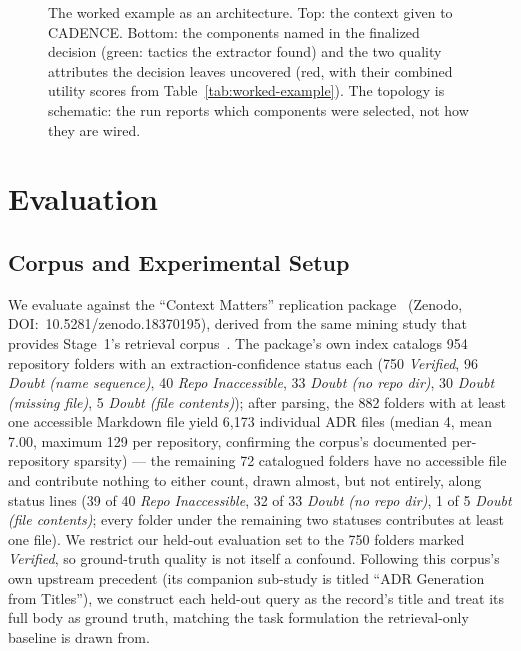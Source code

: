 \documentclass[preprint,12pt,authoryear]{elsarticle}
\renewcommand{\_}{\textunderscore\allowbreak{}}
\begin{document}
\begin{figure}[!htbp]
\centering
{}
\caption{The worked example as an architecture. Top: the context given to CADENCE. Bottom: the components named in the finalized decision (green: tactics the extractor found) and the two quality attributes the decision leaves uncovered (red, with their combined utility scores from Table~\ref{tab:worked-example}). The topology is schematic: the run reports which components were selected, not how they are wired.\label{fig:example-architecture}}
\end{figure}
\FloatBarrier

\section{Evaluation}
\label{sec:evaluation}

\subsection{Corpus and Experimental Setup}

We evaluate against the ``Context Matters'' replication package~\citep{contextmatters-zenodo} (Zenodo, DOI:~10.5281/zenodo.18370195), derived from the same mining study that provides Stage~1's retrieval corpus~\citep{buchgeher2023adr}. The package's own index catalogs 954 repository folders with an extraction-confidence status each (750 \textit{Verified}, 96 \textit{Doubt (name sequence)}, 40 \textit{Repo Inaccessible}, 33 \textit{Doubt (no repo dir)}, 30 \textit{Doubt (missing file)}, 5 \textit{Doubt (file contents)}); after parsing, the 882 folders with at least one accessible Markdown file yield 6{,}173 individual ADR files (median 4, mean 7.00, maximum 129 per repository, confirming the corpus's documented per-repository sparsity) --- the remaining 72 catalogued folders have no accessible file and contribute nothing to either count, drawn almost, but not entirely, along status lines (39 of 40 \textit{Repo Inaccessible}, 32 of 33 \textit{Doubt (no repo dir)}, 1 of 5 \textit{Doubt (file contents)}; every folder under the remaining two statuses contributes at least one file). We restrict our held-out evaluation set to the 750 folders marked \textit{Verified}, so ground-truth quality is not itself a confound. Following this corpus's own upstream precedent (its companion sub-study is titled ``ADR Generation from Titles''), we construct each held-out query as the record's title and treat its full body as ground truth, matching the task formulation the retrieval-only baseline is drawn from.
\end{document}
